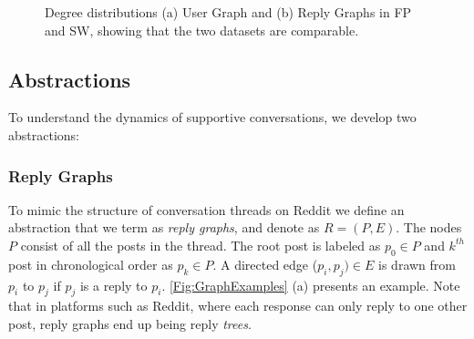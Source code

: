 \begin{figure}
    \centering
    \caption{Degree distributions  (a) User Graph and (b) Reply Graphs in FP and SW, showing that the two datasets are comparable.}
    \label{fig:degdist}
\end{figure}

\subsection{Abstractions} \label{sec:abstractions}
To understand the dynamics of supportive conversations, we develop two abstractions: 
\subsubsection{Reply Graphs} \label{sec:reply_graphs}
To mimic
the structure of conversation threads on Reddit 
we define
an abstraction 
that
we term as \textit{reply graphs}, and denote as $R = (P,E)$. The nodes $P$ consist of all the posts in the thread. The root post is labeled as $p_0 \in P$ and $k^{th}$ post in chronological order as $p_k \in P$. A directed edge ($p_i,p_j) \in E$ is drawn from $p_i$ to $p_j$ if $p_j$ is a reply to $p_i$. \ref{Fig:GraphExamples} (a) presents an example. Note that in platforms such as Reddit, where each response can only reply to one other post, reply graphs end up being reply \textit{trees}.


